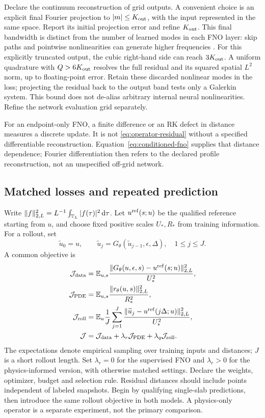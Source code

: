 Declare the continuum reconstruction of grid outputs.  A convenient
choice is an explicit final Fourier projection to $|m|\leq K_{\rm out}$,
with the input represented in the same space.  Report its initial
projection error and refine $K_{\rm out}$.  This final bandwidth is
distinct from the number of learned modes in each FNO layer: skip
paths and pointwise nonlinearities can generate higher frequencies
\cite[\S3 and Appendix E]{pino}\cite[\S\S3--4]{stability}.
For this explicitly truncated output, the cubic right-hand side can
reach $3K_{\rm out}$.  A uniform quadrature with $Q>6K_{\rm out}$
resolves the full residual and its squared spatial $L^2$ norm, up to
floating-point error.  Retain these discarded nonlinear modes in the
loss; projecting the residual back to the output band tests only a
Galerkin system.  This bound does not de-alias arbitrary internal neural
nonlinearities.  Refine the network evaluation grid separately.

For an endpoint-only FNO, a finite difference or an RK defect in
distance measures a discrete update.  It is not
\eqref{eq:operator-residual} without a specified differentiable
reconstruction.  Equation~\eqref{eq:conditioned-fno} supplies that
distance dependence; Fourier differentiation then refers to the
declared profile reconstruction, not an unspecified off-grid network.

\subsection{Matched losses and repeated prediction}

Write $\lVert f\rVert_{2,L}^2=L^{-1}\int_{\mathbb T_L}|f(\tau)|^2\,\mathrm d\tau$.
Let $u^{\rm ref}(s;u)$ be the qualified reference starting from $u$,
and choose fixed positive scales $U_*,R_*$ from training information.
For a rollout, set
\[
 \widetilde u_0=u,\qquad
 \widetilde u_j=G_\theta(\widetilde u_{j-1},\epsilon,\Delta),
 \quad 1\leq j\leq J.
\]
A common objective is
\begin{align}
 \mathcal J_{\rm data}
 &=\mathbb E_{u,s}
   \frac{\lVert G_\theta(u,\epsilon,s)-u^{\rm ref}(s;u)\rVert_{2,L}^2}{U_*^2},
 \notag\\
 \mathcal J_{\rm PDE}
 &=\mathbb E_{u,s}\frac{\lVert r_\theta(u,s)\rVert_{2,L}^2}{R_*^2},
 \notag\\
 \mathcal J_{\rm roll}
 &=\mathbb E_u\frac1J\sum_{j=1}^J
   \frac{\lVert \widetilde u_j-u^{\rm ref}(j\Delta;u)\rVert_{2,L}^2}{U_*^2},
 \notag\\
 \mathcal J
 &=\mathcal J_{\rm data}+\lambda_r\mathcal J_{\rm PDE}
   +\lambda_q\mathcal J_{\rm roll}.
 \label{eq:operator-loss}
\end{align}
The expectations denote empirical sampling over training inputs and
distances; $J$ is a short rollout length.  Set $\lambda_r=0$ for the
supervised FNO and $\lambda_r>0$ for the physics-informed version,
with otherwise matched settings.  Declare the weights, optimizer,
budget and selection rule.  Residual distances should include points
independent of labeled snapshots.  Begin by qualifying single-slab
predictions, then introduce the same rollout objective in both models.
A physics-only operator is a separate experiment, not the primary
comparison.

